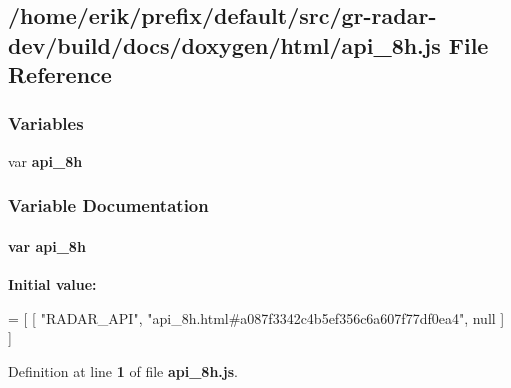 \subsection{/home/erik/prefix/default/src/gr-\/radar-\/dev/build/docs/doxygen/html/api\+\_\+8h.js File Reference}
\label{api__8h_8js}
\subsubsection*{Variables}
\begin{DoxyCompactItemize}
\item 
var {\bf api\+\_\+8h}
\end{DoxyCompactItemize}


\subsubsection{Variable Documentation}
\paragraph[{api\+\_\+8h}]{\setlength{\rightskip}{0pt plus 5cm}var api\+\_\+8h}\label{api__8h_8js_aaa7de18cf64f34167bf1774bf81a76d3}
{\bfseries Initial value\+:}
\begin{DoxyCode}
=
[
    [ \textcolor{stringliteral}{"RADAR\_API"}, \textcolor{stringliteral}{"api\_8h.html#a087f3342c4b5ef356c6a607f77df0ea4"}, null ]
]
\end{DoxyCode}


Definition at line {\bf 1} of file {\bf api\+\_\+8h.\+js}.

